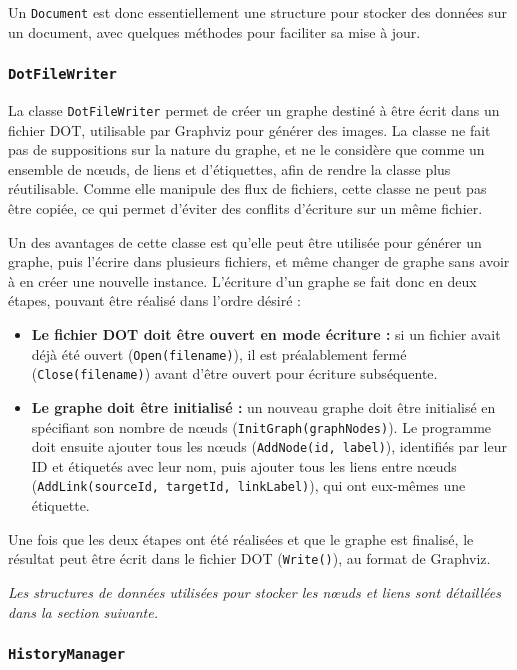 \documentclass[11pt,a4paper]{article}
\begin{document}
Un \texttt{Document} est donc essentiellement une structure pour stocker des données sur un document, avec quelques méthodes pour faciliter sa mise à jour.

\subsubsection{\texttt{DotFileWriter}}

La classe \texttt{DotFileWriter} permet de créer un graphe destiné à être écrit dans un fichier DOT, utilisable par Graphviz pour générer des images. La classe ne fait pas de suppositions sur la nature du graphe, et ne le considère que comme un ensemble de nœuds, de liens et d'étiquettes, afin de rendre la classe plus réutilisable. Comme elle manipule des flux de fichiers, cette classe ne peut pas être copiée, ce qui permet d'éviter des conflits d'écriture sur un même fichier.

Un des avantages de cette classe est qu'elle peut être utilisée pour générer un graphe, puis l'écrire dans plusieurs fichiers, et même changer de graphe sans avoir à en créer une nouvelle instance. L'écriture d'un graphe se fait donc en deux étapes, pouvant être réalisé dans l'ordre désiré :

\begin{itemize}
    \item \textbf{Le fichier DOT doit être ouvert en mode écriture :} si un fichier avait déjà été ouvert (\texttt{Open(filename)}), il est préalablement fermé (\texttt{Close(filename)}) avant d'être ouvert pour écriture subséquente.
    \item \textbf{Le graphe doit être initialisé :} un nouveau graphe doit être initialisé en spécifiant son nombre de nœuds (\texttt{InitGraph(graphNodes)}). Le programme doit ensuite ajouter tous les nœuds (\texttt{AddNode(id, label)}), identifiés par leur ID et étiquetés avec leur nom, puis ajouter tous les liens entre nœuds (\texttt{AddLink(sourceId, targetId, linkLabel)}), qui ont eux-mêmes une étiquette.
\end{itemize}

Une fois que les deux étapes ont été réalisées et que le graphe est finalisé, le résultat peut être écrit dans le fichier DOT (\texttt{Write()}), au format de Graphviz.

\textit{Les structures de données utilisées pour stocker les nœuds et liens sont détaillées dans la section suivante.}

\subsubsection{\texttt{HistoryManager}}
\end{document}
